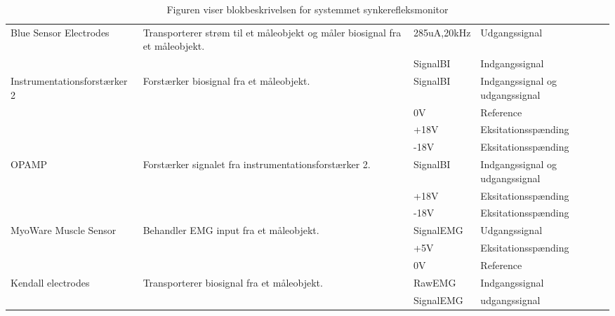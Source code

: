 \begin{table}[H]
\begin{tabular}{|p{4.3cm}|p{3.6cm}|p{2cm}|p{4cm}|}
Blue Sensor Electrodes & Transporterer strøm til et måleobjekt og måler biosignal fra et måleobjekt.
 &  $   ${285uA,20kHz} & Udgangssignal  \\ \cline{3-4}
&  & SignalBI & Indgangssignal   \\ \cline{3-4}  \hline 	 
 
 
Instrumentationsforstærker 2 &Forstærker biosignal fra et måleobjekt. 
&   SignalBI & Indgangssignal og udgangssignal  \\ \cline{3-4}
&  & $   ${0V} & Reference  \\ \cline{3-4}
&  & $   ${+18V} & Eksitationsspænding   \\ \cline{3-4} 
&  & $   ${-18V} & Eksitationsspænding   \\ \cline{3-4} 	\hline 
 	
OPAMP & Forstærker signalet fra instrumentationsforstærker 2. 
&   SignalBI & Indgangssignal og udgangssignal  \\ \cline{3-4}
&  & $   ${+18V} & Eksitationsspænding   \\ \cline{3-4} 
&  & $   ${-18V} & Eksitationsspænding   \\ \cline{3-4}  	 \hline


MyoWare Muscle Sensor & Behandler EMG input fra et måleobjekt. 
&   SignalEMG & Udgangssignal  \\ \cline{3-4}
&  & $   ${+5V} & Eksitationsspænding   \\ \cline{3-4} 
&  & $   ${0V} & Reference   \\ \cline{3-4}  	 \hline
 
 
Kendall electrodes & Transporterer biosignal fra et måleobjekt. 
&    RawEMG & Indgangssignal  \\ \cline{3-4}
&  & SignalEMG & udgangssignal   \\ \cline{3-4} 

 	 
\hline  
\end{tabular}
\caption{Figuren viser blokbeskrivelsen for systemmet synkerefleksmonitor} \label{BlokBeskr}
\end{table}

\pagebreak

